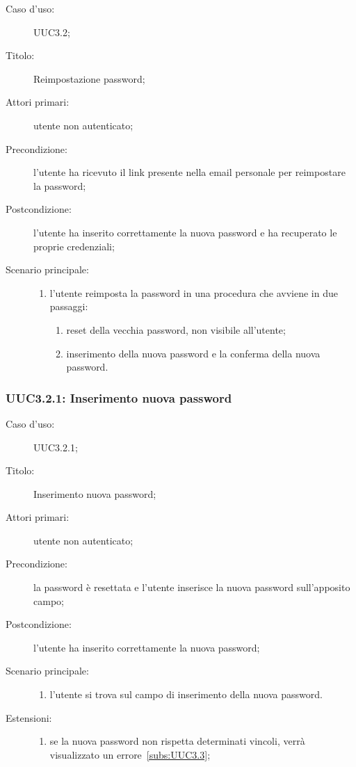 \documentclass[../../../analisi-dei-requisiti.tex]{subfiles}
\begin{document}
\begin{description}
  \item[Caso d’uso:] UUC3.2;
  \item[Titolo:] Reimpostazione password;
  \item[Attori primari:] utente non autenticato;
  \item[Precondizione:] l'utente ha ricevuto il link presente nella email personale per reimpostare la password;
  \item[Postcondizione:] l'utente ha inserito correttamente la nuova password e ha recuperato le proprie credenziali;
  \item[Scenario principale:]
        \begin{enumerate}
          \item l'utente reimposta la password in una procedura che avviene in due passaggi:
                \begin{enumerate}
                  \item reset della vecchia password, non visibile all'utente;
                  \item inserimento della nuova password e la conferma della nuova password.
                \end{enumerate}
        \end{enumerate}
\end{description}

\subsubsection{UUC3.2.1: Inserimento nuova password}%
\label{subs:UUC3.2.1}
\begin{description}
  \item[Caso d’uso:] UUC3.2.1;
  \item[Titolo:] Inserimento nuova password;
  \item[Attori primari:] utente non autenticato;
  \item[Precondizione:] la password è resettata e l'utente inserisce la nuova password sull'apposito campo;
  \item[Postcondizione:] l'utente ha inserito correttamente la nuova password;
  \item[Scenario principale:]
        \begin{enumerate}
          \item l'utente si trova sul campo di inserimento della nuova password.
        \end{enumerate}
  \item[Estensioni:]
        \begin{enumerate}
          \item se la nuova password non rispetta determinati vincoli, verrà visualizzato un errore~\ref{subs:UUC3.3};
        \end{enumerate}
\end{description}
\end{document}
